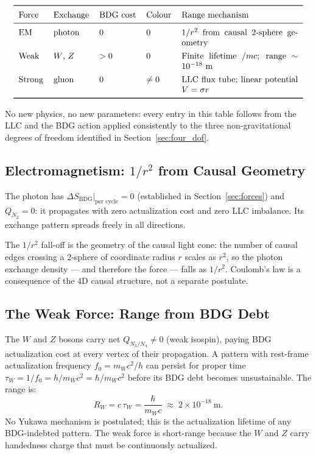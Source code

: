 \documentclass[11pt,a4paper]{article}
\newcommand{\SBDG}{S_{\mathrm{BDG}}}
\begin{document}
\begin{equation}
\renewcommand{\arraystretch}{1.3}
\begin{tabular}{llllp{4.8cm}}
\toprule
Force & Exchange & BDG cost & Colour & Range mechanism \\
\midrule
EM & photon & $0$ & $0$ &
  $1/r^2$ from causal 2-sphere geometry \\
Weak & $W$, $Z$ & $>0$ & $0$ &
  Finite lifetime $\hbar/mc$; range $\sim 10^{-18}$~m \\
Strong & gluon & $0$ & $\neq 0$ &
  LLC flux tube; linear potential $V = \sigma r$ \\
\bottomrule
\end{tabular}
\label{tab:ranges}
\end{equation}

No new physics, no new parameters: every entry in this table follows from
the LLC and the BDG action applied consistently to the three non-gravitational
degrees of freedom identified in Section~\ref{sec:four_dof}.

\subsection{Electromagnetism: $1/r^2$ from Causal Geometry}

The photon has $\Delta\SBDG|_\text{per cycle} = 0$ (established in
Section~\ref{sec:forces}) and $Q_{N_2} = 0$: it propagates with zero
actualization cost and zero LLC imbalance. Its exchange pattern spreads
freely in all directions.

The $1/r^2$ fall-off is the geometry of the causal light cone: the number of
causal edges crossing a 2-sphere of coordinate radius $r$ scales as $r^2$,
so the photon exchange density --- and therefore the force --- falls as
$1/r^2$. Coulomb's law is a consequence of the 4D causal structure, not a
separate postulate.

\subsection{The Weak Force: Range from BDG Debt}

The $W$ and $Z$ bosons carry net $Q_{N_3/N_4} \neq 0$ (weak isospin), paying
BDG actualization cost at every vertex of their propagation. A pattern with
rest-frame actualization frequency $f_0 = m_W c^2/h$ can persist for proper
time $\tau_W = 1/f_0 = h/m_W c^2 = \hbar/m_W c^2$ before its BDG debt becomes
unsustainable. The range is:
\begin{equation}
  R_W = c\,\tau_W = \frac{\hbar}{m_W c} \;\approx\; 2 \times 10^{-18}~\text{m}.
  \label{eq:weak_range}
\end{equation}
No Yukawa mechanism is postulated; this is the actualization lifetime of any
BDG-indebted pattern. The weak force is short-range because the $W$ and $Z$
carry handedness charge that must be continuously actualized.
\end{document}
